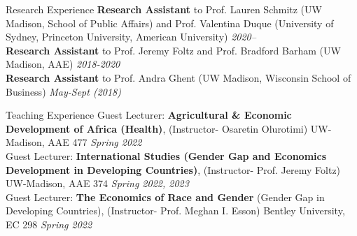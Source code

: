 \documentclass{resume} %
\begin{document}
\begin{rSection}{Research Experience}
\textbf{Research Assistant} to Prof. Lauren Schmitz (UW Madison, School of Public Affairs) and Prof. Valentina Duque (University of Sydney, Princeton University, American University) \hfill \textit{2020--} \\
\textbf{Research Assistant} to Prof. Jeremy Foltz and Prof. Bradford Barham (UW Madison, AAE) \hfill \textit{2018-2020} \\
\textbf{Research Assistant} to Prof. Andra Ghent (UW Madison, Wisconsin School of Business) \hfill \textit{May-Sept (2018)}
\end{rSection}


\begin{rSection}{Teaching Experience}
Guest Lecturer: \textbf{Agricultural \& Economic Development of Africa (Health)}, (Instructor- Osaretin Olurotimi) UW-Madison, AAE 477
 \hfill \textit{Spring 2022} \\
Guest Lecturer: \textbf{International Studies (Gender Gap and Economics Development in Developing Countries)}, (Instructor- Prof. Jeremy Foltz) UW-Madison, AAE 374
 \hfill \textit{Spring 2022, 2023} \\
Guest Lecturer: \textbf{The Economics of Race and Gender} (Gender Gap in Developing Countries), (Instructor- Prof. Meghan I. Esson) Bentley University, EC 298
 \hfill \textit{Spring 2022}
\end{rSection}
\end{document}
